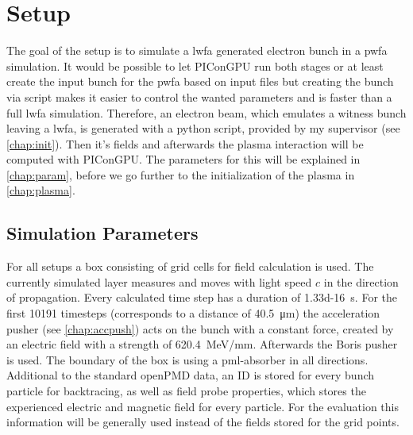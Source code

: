 \documentclass[bachelor_thesis]{subfiles}
\begin{document}
\chapter{Setup}
The goal of the setup is to simulate a \gls{lwfa} generated electron bunch in a \gls{pwfa} simulation. It would be possible to let PIConGPU run both stages or at least create the input bunch for the \gls{pwfa} based on input files
but creating the bunch via script makes it easier to control the wanted parameters and is faster than a full \gls{lwfa} simulation. Therefore, an electron beam, which emulates a witness bunch leaving a \gls{lwfa}, is generated with a python script,
provided by my supervisor (see \autoref{chap:init}). Then it's fields and afterwards the plasma interaction will be computed with PIConGPU. The parameters for this will  be explained in \autoref{chap:param}, 
before we go further to the initialization of the plasma in \autoref{chap:plasma}.


\section{Simulation Parameters}\label{chap:param}
For all setups a box consisting of  grid cells for field calculation is used. The currently simulated layer measures  and moves with light speed $c$ in the direction of propagation.
Every calculated time step has a duration of \qty{1.33d-16}{\s}. For the first \num{10191} timesteps (corresponds to a distance of \qty{40.5}{\um}) the acceleration pusher (see \autoref{chap:accpush}) acts on the bunch with a constant force, 
created by an electric field with a strength of \qty{620.4}{\MeV/\mm}. Afterwards the Boris pusher is used. The boundary of the box is using a \gls{pml}-absorber in all directions. Additional to the standard openPMD data, an ID is stored for every bunch particle for backtracing,
as well as field probe properties, which stores the experienced electric and magnetic field for every particle. For the evaluation this information will be generally used instead of the fields stored for the grid points.
\end{document}

